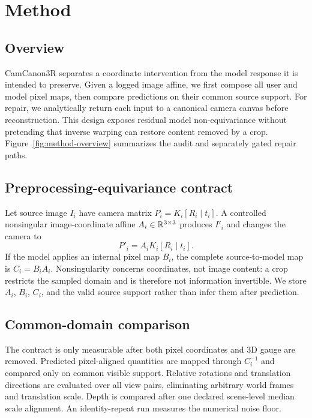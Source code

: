 \section{Method}
\label{sec:method}

\subsection{Overview}
CamCanon3R separates a coordinate intervention from the model response it is
intended to preserve.  Given a logged image affine, we first compose all user
and model pixel maps, then compare predictions on their common source support.
For repair, we analytically return each input to a canonical camera canvas
before reconstruction.  This design exposes residual model non-equivariance
without pretending that inverse warping can restore content removed by a crop.
Figure~\ref{fig:method-overview} summarizes the audit and separately gated
repair paths.

\subsection{Preprocessing-equivariance contract}
Let source image $I_i$ have camera matrix
$P_i=K_i[R_i\mid t_i]$.  A controlled nonsingular image-coordinate affine
$A_i\in\mathbb{R}^{3\times3}$ produces $I'_i$ and changes the camera to
\begin{equation}
  P'_i=A_iK_i[R_i\mid t_i].
\end{equation}
If the model applies an internal pixel map $B_i$, the complete source-to-model
map is $C_i=B_iA_i$.  Nonsingularity concerns coordinates, not image content:
a crop restricts the sampled domain and is therefore not information
invertible.  We store $A_i$, $B_i$, $C_i$, and the valid source support rather
than infer them after prediction.

\subsection{Common-domain comparison}
The contract is only measurable after both pixel coordinates and 3D gauge are
removed.  Predicted pixel-aligned quantities are mapped through $C_i^{-1}$ and
compared only on common visible support.  Relative rotations and
translation directions are evaluated over all view pairs, eliminating
arbitrary world frames and translation scale.  Depth is compared after one
declared scene-level median scale alignment.  An identity-repeat run measures
the numerical noise floor.

